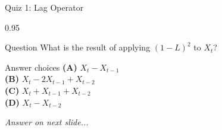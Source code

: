 \documentclass[9pt, aspectratio=169, t]{beamer}
\begin{document}
\begin{frame}{Quiz 1: Lag Operator}
    \begin{cminipage}{0.95\textwidth}
    \begin{alertblock}{Question}
        What is the result of applying $(1-L)^2$ to $X_t$?
    \end{alertblock}

    \vspace{0.4cm}

    \begin{block}{Answer choices}
        \textcolor{MainBlue}{\textbf{(A)}} $X_t - X_{t-1}$\\[3pt]
        \textcolor{MainBlue}{\textbf{(B)}} $X_t - 2X_{t-1} + X_{t-2}$\\[3pt]
        \textcolor{MainBlue}{\textbf{(C)}} $X_t + X_{t-1} + X_{t-2}$\\[3pt]
        \textcolor{MainBlue}{\textbf{(D)}} $X_t - X_{t-2}$
    \end{block}

    \vspace{0.5cm}

    \begin{center}
        \textit{Answer on next slide...}
    \end{center}
    \end{cminipage}
\end{frame}
\end{document}
